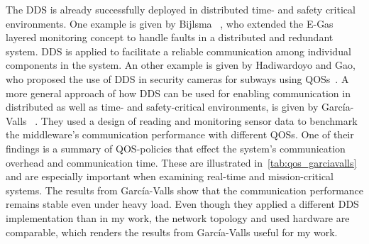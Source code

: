 The \gls*{DDS} is already successfully deployed in distributed time- and safety critical environments.
One example is given by Bijlsma \etal~\cite{DistributedSafety2020}, who extended the E-Gas layered monitoring concept to handle faults in a distributed and redundant system.
\Gls*{DDS} is applied to facilitate a reliable communication among individual components in the system.
An other example is given by Hadiwardoyo and Gao, who proposed the use of \gls*{DDS} in security cameras for subways using \glspl*{QOS}~\cite{DDSInSubways}.
A more general approach of how \gls*{DDS} can be used for enabling communication in distributed as well as time- and safety-critical environments, is given by García-Valls \etal~\cite{GarciaVallsDDSInDistributed}.
They used a design of reading and monitoring sensor data to benchmark the middleware's communication performance with different \glspl*{QOS}.
One of their findings is a summary of \gls*{QOS}-policies that effect the system's communication overhead and communication time.
These are illustrated in~\autoref{tab:qos_garciavalls} and are especially important when examining real-time and mission-critical systems.
The results from García-Valls \etal show that the communication performance remains stable even under heavy load.
Even though they applied a different \gls*{DDS} implementation than in my work, the network topology and used hardware are comparable, which renders the results from García-Valls \etal useful for my work.
